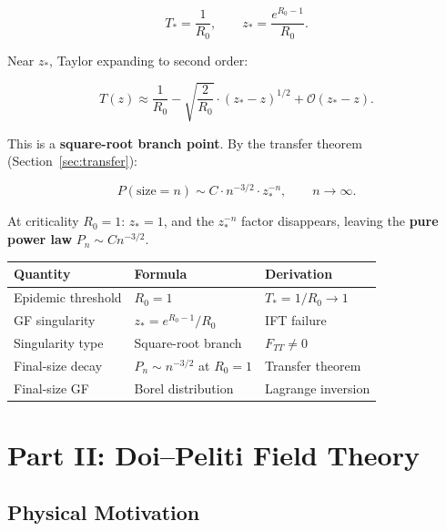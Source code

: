 \documentclass[11pt,a4paper]{article}
\theoremstyle{definition}
\begin{document}
\begin{equation}
  T_* = \frac{1}{R_0}, \qquad z_* = \frac{e^{R_0 - 1}}{R_0}.
  \label{eq:sir_singularity}
\end{equation}

Near $z_*$, Taylor expanding to second order:

\begin{equation}
  T(z) \approx \frac{1}{R_0} - \sqrt{\frac{2}{R_0}} \cdot (z_* - z)^{1/2}
  + \mathcal{O}(z_* - z).
  \label{eq:sir_sqrtbranch}
\end{equation}

This is a \textbf{square-root branch point}. By the transfer theorem
(Section~\ref{sec:transfer}):

\begin{equation}
  \boxed{P(\text{size} = n) \sim C \cdot n^{-3/2} \cdot z_*^{-n}, \qquad n\to\infty.}
  \label{eq:sir_asymptotics}
\end{equation}

At criticality $R_0 = 1$: $z_* = 1$, and the $z_*^{-n}$ factor disappears, leaving
the \textbf{pure power law} $P_n \sim C n^{-3/2}$.

\begin{resultbox}
\begin{center}
\begin{tabular}{lll}
\toprule
Quantity & Formula & Derivation \\
\midrule
Epidemic threshold & $R_0 = 1$ & $T_* = 1/R_0 \to 1$ \\
GF singularity & $z_* = e^{R_0-1}/R_0$ & IFT failure \\
Singularity type & Square-root branch & $F_{TT} \neq 0$ \\
Final-size decay & $P_n \sim n^{-3/2}$ at $R_0=1$ & Transfer theorem \\
Final-size GF & Borel distribution & Lagrange inversion \\
\bottomrule
\end{tabular}
\end{center}
\end{resultbox}

\clearpage

\section{Part II: Doi--Peliti Field Theory}
\label{sec:dp}

\subsection{Physical Motivation}
\end{document}
